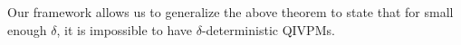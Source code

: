 \documentclass[english,reprint, aps, prl,superscriptaddress, showpacs,
showkeys, longbibliography, amsmath, amssymb, floatfix]{revtex4-1}
\theoremstyle{plain}
\theoremstyle{definition}
\newcommand{\events}{\ensuremath{\mathcal{E}}}
\newcommand{\proj}[1]{\op{#1}{#1}}
\begin{document}


Our framework allows us to generalize the above theorem to state that
for small enough $\delta$, it is impossible to have
$\delta$-deterministic QIVPMs. 
\end{document}
